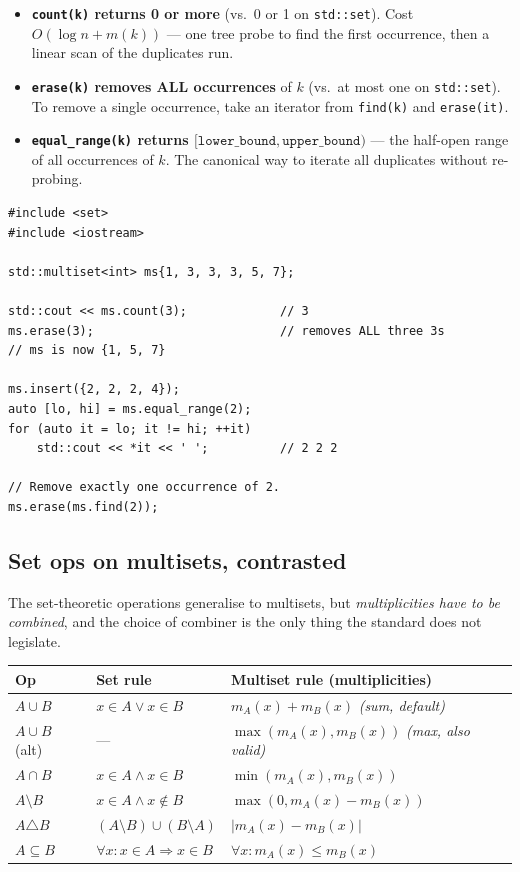 \documentclass[11pt]{article}
\begin{document}
\begin{itemize}[leftmargin=*]
    \item \textbf{\texttt{count(k)} returns 0 or more} (vs.\ 0 or 1
          on \texttt{std::set}). Cost
          $O(\log n + m(k))$ --- one tree probe to find the first
          occurrence, then a linear scan of the duplicates run.
    \item \textbf{\texttt{erase(k)} removes ALL occurrences} of $k$
          (vs.\ at most one on \texttt{std::set}). To remove a
          single occurrence, take an iterator from \texttt{find(k)}
          and \texttt{erase(it)}.
    \item \textbf{\texttt{equal\_range(k)} returns
          $[\texttt{lower\_bound}, \texttt{upper\_bound})$} ---
          the half-open range of all occurrences of $k$. The
          canonical way to iterate all duplicates without
          re-probing.
\end{itemize}

\begin{lstlisting}[basicstyle=\ttfamily\small,frame=single]
#include <set>
#include <iostream>

std::multiset<int> ms{1, 3, 3, 3, 5, 7};

std::cout << ms.count(3);             // 3
ms.erase(3);                          // removes ALL three 3s
// ms is now {1, 5, 7}

ms.insert({2, 2, 2, 4});
auto [lo, hi] = ms.equal_range(2);
for (auto it = lo; it != hi; ++it)
    std::cout << *it << ' ';          // 2 2 2

// Remove exactly one occurrence of 2.
ms.erase(ms.find(2));
\end{lstlisting}

\subsection*{Set ops on multisets, contrasted}

The set-theoretic operations generalise to multisets, but
\emph{multiplicities have to be combined}, and the choice of
combiner is the only thing the standard does not legislate.

\begin{center}
\begin{tabular}{lll}
\hline
Op & Set rule & Multiset rule (multiplicities) \\
\hline
$A \cup B$ &
$x \in A \lor x \in B$ &
$m_A(x) + m_B(x)$ \emph{(sum, default)} \\
$A \cup B$ (alt) &
--- &
$\max(m_A(x), m_B(x))$ \emph{(max, also valid)} \\
$A \cap B$ &
$x \in A \land x \in B$ &
$\min(m_A(x), m_B(x))$ \\
$A \setminus B$ &
$x \in A \land x \notin B$ &
$\max(0, m_A(x) - m_B(x))$ \\
$A \triangle B$ &
$(A \setminus B) \cup (B \setminus A)$ &
$|m_A(x) - m_B(x)|$ \\
$A \subseteq B$ &
$\forall x: x \in A \Rightarrow x \in B$ &
$\forall x: m_A(x) \le m_B(x)$ \\
\hline
\end{tabular}
\end{center}
\end{document}
